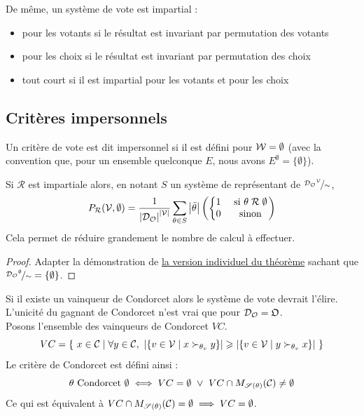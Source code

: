 \noindent De même, un système de vote est impartial :
\begin{itemize}
	\item pour les votants si le résultat est invariant par permutation des votants
	\item pour les choix si le résultat est invariant par permutation des choix
	\item tout court si il est impartial pour les votants et pour les choix
\end{itemize}


\subsection{Critères impersonnels}

Un critère de vote est dit impersonnel si il est défini pour $\mathcal{W} = \emptyset$ (avec la convention que, pour un ensemble quelconque $E$, nous avons $E^\emptyset = \{\emptyset\}$).

\begin{theoreme}
	Si $\mathcal{R}$ est impartiale alors,
	en notant $S$ un système de représentant de $\nicefrac{{\mathcal{D}_\mathcal{O}}^{\mathcal{V}}}{\sim}$,
	\begin{equation}
		P_\mathcal{R} (\mathcal{V}, \emptyset) =
		\frac{1}{ \left|\mathcal{D}_\mathcal{O}\right| ^ {\left|\mathcal{V}\right|} }
		\sum_{\theta \in S} \left|\bar{\theta}\right|
		\left(
		\left\{\begin{matrix}
			1 &\text{ si } \theta \;\mathcal{R}\; \emptyset \\
			0 &\text{ sinon}
		\end{matrix}\right.
		\right)
	\end{equation}
	Cela permet de réduire grandement le nombre de calcul à effectuer.
\end{theoreme}

\begin{proof}
	Adapter la démonstration de \hyperref[individuel d'invariance par impartialité]{la version individuel du théorème} sachant que $\nicefrac{{\mathcal{D}_\mathcal{O}}^\emptyset}{\sim} = \{\emptyset\}$.
\end{proof}

\begin{definition}
	Si il existe un vainqueur de Condorcet alors le système de vote devrait l'élire. L'unicité du gagnant de Condorcet n'est vrai que pour $\mathcal{D}_\mathcal{O} = \mathfrak{O}$. \\
	Posons l'ensemble des vainqueurs de Condorcet $VC$.
	\begin{equation*}
		VC = \left\{ \
			x \in \mathcal{C} \; | \;
			\forall y \in \mathcal{C}, \
			\left|\left\{ v \in \mathcal{V} \;|\; x \succ_{\theta_v} y \right\}\right|
			\geqslant \left|\left\{ v \in \mathcal{V} \;|\; y \succ_{\theta_v} x \right\}\right|
		\ \right\}
	\end{equation*}
	Le critère de Condorcet est défini ainsi :
	\begin{equation}
		\theta \text{ Condorcet } \emptyset \iff
		VC = \emptyset
		\ \vee \
		VC \cap M_{\mathscr{S}(\theta)}(\mathcal{C}) \neq \emptyset
	\end{equation}
	Ce qui est équivalent à $VC \cap M_{\mathscr{S}(\theta)}(\mathcal{C}) = \emptyset \implies VC = \emptyset$.
\end{definition}

